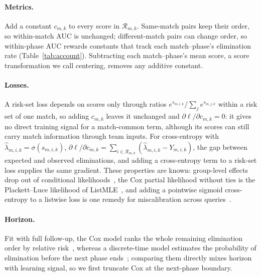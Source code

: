 \documentclass[sigconf,anonymous,nonacm]{acmart}
\begin{document}
\paragraph{Metrics.}
Add a constant $c_{m,k}$ to every score in $\mathcal{R}_{m,k}$. Same-match pairs keep their order, so within-match AUC is unchanged; different-match pairs can change order, so within-phase AUC rewards constants that track each match--phase's elimination rate (Table~\ref{tab:account}). Subtracting each match--phase's mean score, a score transformation we call centering, removes any additive constant.

\paragraph{Losses.}
A risk-set loss depends on scores only through ratios $e^{s_{m,i,k}}/\sum_{j}e^{s_{m,j,k}}$ within a risk set of one match, so adding $c_{m,k}$ leaves it unchanged and $\partial\ell/\partial c_{m,k}=0$: it gives no direct training signal for a match-common term, although its scores can still carry match information through team inputs. For cross-entropy with $\hat\lambda_{m,i,k}=\sigma(s_{m,i,k})$, $\partial\ell/\partial c_{m,k}=\sum_{i\in\mathcal{R}_{m,k}}(\hat\lambda_{m,i,k}-Y_{m,i,k})$, the gap between expected and observed eliminations, and adding a cross-entropy term to a risk-set loss supplies the same gradient. These properties are known: group-level effects drop out of conditional likelihoods~\cite{Chamberlain80}, the Cox partial likelihood without ties is the Plackett--Luce likelihood of ListMLE~\cite{Xia08}, and adding a pointwise sigmoid cross-entropy to a listwise loss is one remedy for miscalibration across queries~\cite{Bai23}.

\paragraph{Horizon.}
Fit with full follow-up, the Cox model ranks the whole remaining elimination order by relative risk~\cite{Cox72}, whereas a discrete-time model estimates the probability of elimination before the next phase ends~\cite{SingerWillett93,Gensheimer19}; comparing them directly mixes horizon with learning signal, so we first truncate Cox at the next-phase boundary.
\end{document}
